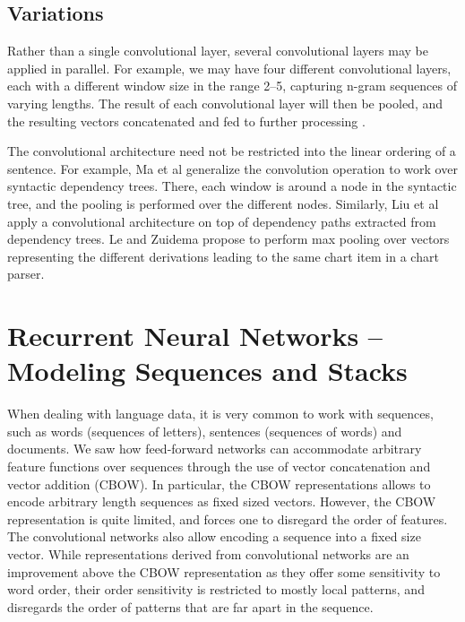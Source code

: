 \documentclass[jair,twoside,11pt,theapa]{article}
\newcommand{\ygcomment}[1]{\textbf{[TODO: #1]}}
\renewcommand{\ygcomment}[1]{}
\renewcommand{\shortcite}[0]{\citeyear}
\begin{document}
{\subsection{Variations}

Rather than a single convolutional layer, several convolutional layers may be
applied in parallel. For example, we may have four different convolutional
layers, each with a different window size in the range 2--5, capturing n-gram
sequences of varying lengths.  
The result of each convolutional layer will then
be pooled, and the resulting vectors concatenated and fed to further processing
\cite{kim2014convolutional}.

The convolutional architecture need not be restricted into the linear ordering
of a sentence.  For example, Ma et al \shortcite{ma2015dependencybased}  generalize the
convolution operation to work over syntactic dependency trees.  There, each
window is around a node in the syntactic tree, and the pooling is performed over the different nodes.
Similarly, Liu et al \shortcite{liu2015dependencybased} apply a convolutional
architecture on top of dependency paths extracted from dependency trees.
Le and Zuidema \shortcite{le2015forest} propose to perform max pooling 
over vectors representing the different derivations leading to the same chart
item in a chart parser.\ygcomment{elaborate on le and zuidema?}


\clearpage
\section{Recurrent Neural Networks -- Modeling Sequences and Stacks}
\label{sec:rnn}

When dealing with language data, it is very common to work with sequences, such
as words (sequences of letters), sentences (sequences of words) and documents.
We saw how feed-forward networks can accommodate arbitrary feature functions over
sequences through the use of vector concatenation and vector addition (CBOW).
In particular, the CBOW representations allows to encode arbitrary length
sequences as fixed sized vectors.
However, the
CBOW representation is quite limited, and forces one to disregard the order of
features.  The convolutional networks also allow encoding a sequence into a
fixed size vector. While representations derived from convolutional networks
are an improvement above the CBOW representation as they offer some sensitivity
to word order, their order sensitivity is restricted to mostly local patterns,
and disregards the order of patterns that are far apart in the sequence.

}
\end{document}
